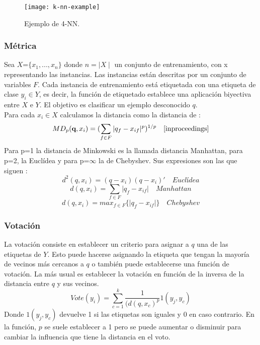 \begin{figure}[H]
  \centering
  \texttt{[image: k-nn-example]}
  \caption{Ejemplo de 4-NN.}
  \label{fig:k-nn-example}
\end{figure}
\begin{center}
\cite{peterson2009k}
\end{center}

\subsubsection{Métrica}
Sea $X$=$\lbrace x_{1},...,x_{n} \rbrace$ donde $n=\mid X \mid$ un conjunto de entrenamiento, con x representando las instancias. Las instancias están descritas por un conjunto de variables $F$. Cada instancia de entrenamiento está etiquetada con una etiqueta de clase $y_{i} \in Y$, es decir, la función de etiquetado establece una aplicación biyectiva entre $X$ e $Y$. El objetivo es clasificar un ejemplo desconocido \textbf{$q$}.\cite{padraiddelany2007k}\\
Para cada $x_{i} \in X$ calculamos la distancia como la distancia de :
\[ MD_{p}(\textbf{q},x_{i})= (\sum_{f \in F}  \vert q_{f} - x_{if} \vert ^{p})^{1/p} \quad \cite{inproceedings} \] 
Para p=1 la distancia de Minkowski es la llamada distancia Manhattan, para p=2, la Euclídea y para p=$\infty$ la de Chebyshev. Sus expresiones son las que siguen \cite{inproceedings}:
\[ d^{2}(q,x_{i})= (q-x_{i})(q-x_{i})' \quad Euclídea \]
\[ d(q,x_{i})=\sum_{f \in F}  \vert q_{f} - x_{if} \vert \quad  Manhattan \]
\[ d(q,x_{i})=max_{f \in F} \lbrace \vert q_{f} - x_{if} \vert \rbrace \quad Chebyshev \]

\subsubsection{Votación}
La votación consiste en establecer un criterio para asignar a $q$ una de las etiquetas de $Y$. Esto puede hacerse asignando la etiqueta que tengan la mayoría de vecinos más cercanos a $q$ o también puede establecerse una función de votación. La más usual es establecer la votación en función de la inversa de la distancia entre $q$ y sus vecinos. 
\[ Vote(y_{i}) = \sum^{k}_{c=1} \frac{1}{(d(q,x_{c})^{p}} 1(y_{j},y_{c}) \]
Donde $1(y_{j},y_{c})$ devuelve 1 si las etiquetas son iguales y 0 en caso contrario. En la función, $p$ se suele establecer a 1 pero se puede aumentar o disminuir para cambiar la influencia que tiene la distancia en el voto. \cite{padraiddelany2007k}

